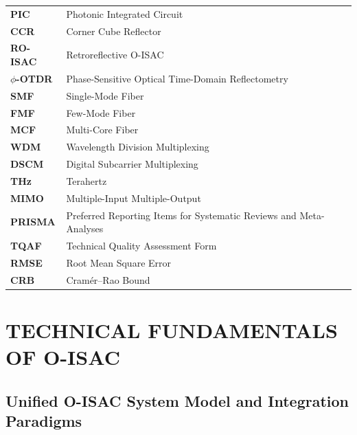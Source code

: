 \documentclass[letterpaper,journal]{IEEEtran}
\begin{document}
\begin{table}[!t]
\begin{tabularx}{\columnwidth}{@{}>{\raggedright\arraybackslash}p{2.6cm}>{\raggedright\arraybackslash}X@{}}
        \textbf{PIC}         & Photonic Integrated Circuit                                        \\
        \textbf{CCR}         & Corner Cube Reflector                                              \\
        \textbf{RO-ISAC}     & Retroreflective O-ISAC                                             \\
        \textbf{$\phi$-OTDR} & Phase-Sensitive Optical Time-Domain Reflectometry                  \\
        \textbf{SMF}         & Single-Mode Fiber                                                  \\
        \textbf{FMF}         & Few-Mode Fiber                                                     \\
        \textbf{MCF}         & Multi-Core Fiber                                                   \\
        \textbf{WDM}         & Wavelength Division Multiplexing                                   \\
        \textbf{DSCM}        & Digital Subcarrier Multiplexing                                    \\
        \textbf{THz}         & Terahertz                                                          \\
        \textbf{MIMO}        & Multiple-Input Multiple-Output                                     \\
        \textbf{PRISMA}      & Preferred Reporting Items for Systematic Reviews and Meta-Analyses \\
        \textbf{TQAF}        & Technical Quality Assessment Form                                  \\
        \textbf{RMSE}        & Root Mean Square Error                                             \\
        \textbf{CRB}         & Cram\'er--Rao Bound                                                \\
        \bottomrule
    \end{tabularx}
\end{table}



\section{TECHNICAL FUNDAMENTALS OF O-ISAC}
\subsection{Unified O-ISAC System Model and Integration Paradigms}
\end{document}
